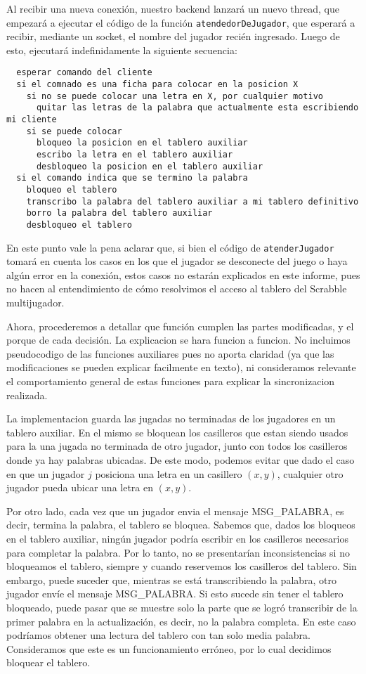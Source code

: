 Al recibir una nueva conexi\'on, nuestro backend lanzar\'a un nuevo thread, que empezar\'a a ejecutar el c\'odigo de la funci\'on \verb|atendedorDeJugador|, 
que esperar\'a a recibir, mediante un socket, el nombre del jugador reci\'en ingresado. Luego de esto, ejecutar\'a indefinidamente la siguiente secuencia:

\begin{verbatim}
  esperar comando del cliente
  si el comnado es una ficha para colocar en la posicion X
    si no se puede colocar una letra en X, por cualquier motivo
      quitar las letras de la palabra que actualmente esta escribiendo mi cliente
    si se puede colocar
      bloqueo la posicion en el tablero auxiliar
      escribo la letra en el tablero auxiliar
      desbloqueo la posicion en el tablero auxiliar
  si el comando indica que se termino la palabra
    bloqueo el tablero
    transcribo la palabra del tablero auxiliar a mi tablero definitivo
    borro la palabra del tablero auxiliar
    desbloqueo el tablero
\end{verbatim}

En este punto vale la pena aclarar que, si bien el c\'odigo de \verb|atenderJugador| tomar\'a en cuenta los casos en los que 
el jugador se desconecte
del juego o haya alg\'un error en la conexi\'on, estos casos no estar\'an explicados en este informe, pues no hacen al entendimiento 
de c\'omo resolvimos
el acceso al tablero del Scrabble multijugador.

Ahora, procederemos a detallar que funci\'on cumplen las partes modificadas, y el porque de cada decisi\'on. La explicacion se hara funcion a funcion. 
No incluimos pseudocodigo de las funciones auxiliares pues no aporta claridad (ya que las modificaciones se pueden explicar facilmente en texto),
ni consideramos relevante el comportamiento general de estas funciones para explicar la sincronizacion realizada.

La implementacion guarda las jugadas no terminadas de los jugadores en un tablero auxiliar. En el mismo se bloquean los casilleros que estan siendo
usados para la una jugada no terminada de otro jugador, junto con todos los casilleros donde ya hay palabras ubicadas. De este modo, podemos
evitar que dado el caso en que un jugador $j$ posiciona una letra en un casillero $(x,y)$, cualquier otro jugador pueda ubicar una letra en $(x,y)$.

Por otro lado, cada vez que un jugador envia el mensaje MSG\_PALABRA, es decir, termina la palabra, el tablero se bloquea. Sabemos que,
dados los bloqueos en el tablero auxiliar, ning\'un jugador podr\'ia escribir en los casilleros necesarios para completar la palabra. Por lo tanto,
no se presentar\'ian inconsistencias si no bloqueamos el tablero, siempre y cuando reservemos los casilleros del tablero. Sin embargo, puede suceder que,
mientras se est\'a transcribiendo la palabra, otro jugador env\'ie el mensaje MSG\_PALABRA. Si esto sucede sin tener el tablero bloqueado, puede pasar que 
se muestre solo la parte que se logr\'o transcribir de la primer palabra en la actualizaci\'on, es decir, no la palabra completa. En este caso podr\'iamos
obtener una lectura del tablero con tan solo media palabra. Consideramos que este es un funcionamiento err\'oneo, por lo cual decidimos bloquear el tablero.

